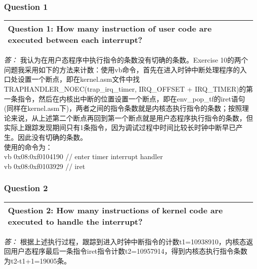 \documentclass[11pt,a4paper]{article}
\newcommand{\exercise}[2]{
\begin{tabular}{|p{\textwidth}|}
\hline
#1: #2\\
\hline
\end{tabular}
\textit{\large{答：}}}
\begin{document}
\subsubsection{Question 1}
\exercise{Question 1}{How many instruction of user code are executed between each interrupt?}
我认为在用户态程序中执行指令的条数没有切确的条数。Exercise 10的两个问题我采用如下的方法来计数：使用vb命令，首先在进入时钟中断处理程序的入口处设置一个断点，即在kernel.asm文件中找TRAPHANDLER\_NOEC(trap\_irq\_timer, IRQ\_OFFSET + IRQ\_TIMER)的第一条指令，然后在内核出中断的位置设置一个断点，即在env\_pop\_tf的iret语句(同样在kernel.asm下)，两者之间的指令条数就是内核态执行指令的条数；按照理论来说，从上述第二个断点再回到第一个断点就是用户态程序执行指令的条数，但实际上跟踪发现期间只有1条指令，因为调试过程中时间比较长时钟中断早已产生。因此没有切确的条数。\\
使用的命令为：\\
vb 0x08:0xf0104190   // enter timer interrupt handler\\
vb 0x08:0xf0103929   // iret\\

\subsubsection{Question 2}
\exercise{Question 2}{How many instructions of kernel code are executed to handle the interrupt?}
根据上述执行过程，跟踪到进入时钟中断指令的计数t1=10938910，内核态返回用户态程序最后一条指令iret指令计数t2=10957914，得到内核态执行指令条数为t2-t1+1=19005条。
\end{document}
